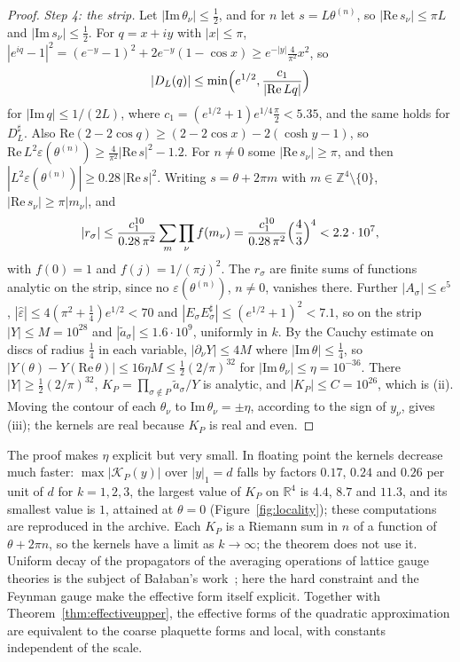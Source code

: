 \documentclass[11pt]{amsart}
\theoremstyle{definition}
\theoremstyle{remark}
\numberwithin{equation}{section}
\newcommand{\R}{\mathbb{R}}
\newcommand{\Z}{\mathbb{Z}}
\begin{document}
\begin{proof}
\emph{Step 4: the strip.} Let $|\mathrm{Im}\,\theta_\nu|\le\frac12$, and for
$n$ let $s=L\theta^{(n)}$, so $|\mathrm{Re}\,s_\nu|\le\pi L$ and
$|\mathrm{Im}\,s_\nu|\le\frac12$. For $q=x+iy$ with $|x|\le\pi$,
$|e^{iq}-1|^2=(e^{-y}-1)^2+2e^{-y}(1-\cos x)\ge e^{-|y|}\frac4{\pi^2}x^2$,
so
\[
|D_L(q)|\le\min\Bigl(e^{1/2},\frac{c_1}{|\mathrm{Re}\,Lq|}\Bigr)
\]
for $|\mathrm{Im}\,q|\le1/(2L)$, where $c_1=(e^{1/2}+1)e^{1/4}\frac\pi2<5.35$, and the same holds for $D_L^\sharp$. Also
$\mathrm{Re}(2-2\cos q)\ge(2-2\cos x)-2(\cosh y-1)$, so
$\mathrm{Re}\,L^2\varepsilon(\theta^{(n)})\ge\frac4{\pi^2}|\mathrm{Re}\,
s|^2-1.2$. For $n\ne0$ some $|\mathrm{Re}\,s_\nu|\ge\pi$, and then
$|L^2\varepsilon(\theta^{(n)})|\ge0.28\,|\mathrm{Re}\,s|^2$. Writing
$s=\theta+2\pi m$ with $m\in\Z^4\setminus\{0\}$, $|\mathrm{Re}\,s_\nu|\ge
\pi|m_\nu|$, and
\[
|r_\sigma|\le\frac{c_1^{10}}{0.28\,\pi^2}\sum_{m}\prod_\nu
f(m_\nu)=\frac{c_1^{10}}{0.28\,\pi^2}\Bigl(\frac43\Bigr)^4
<2.2\cdot10^7,
\]
with $f(0)=1$ and $f(j)=1/(\pi j)^2$. The $r_\sigma$ are finite sums of
functions analytic on the strip, since no $\varepsilon(\theta^{(n)})$,
$n\ne0$, vanishes there. Further $|A_\sigma|\le e^5$, $|\hat\varepsilon|
\le4(\pi^2+\frac14)e^{1/2}<70$ and $|E_\sigma E_\sigma^\sharp|\le
(e^{1/2}+1)^2<7.1$, so on the strip $|Y|\le M=10^{28}$ and $|\tilde
a_\sigma|\le1.6\cdot10^9$, uniformly in $k$. By the Cauchy estimate on
discs of radius $\frac14$ in each variable, $|\partial_\nu Y|\le4M$ where
$|\mathrm{Im}\,\theta|\le\frac14$, so $|Y(\theta)-Y(\mathrm{Re}\,\theta)|\le
16\eta M\le\frac12(2/\pi)^{32}$ for $|\mathrm{Im}\,\theta_\nu|\le\eta=
10^{-36}$. There $|Y|\ge\frac12(2/\pi)^{32}$, $K_P=\prod_{\sigma\notin P}
\tilde a_\sigma/Y$ is analytic, and $|K_P|\le C=10^{26}$, which is (ii).
Moving the contour of each $\theta_\nu$ to $\mathrm{Im}\,\theta_\nu=
\pm\eta$, according to the sign of $y_\nu$, gives (iii); the kernels are
real because $K_P$ is real and even.
\end{proof}

The proof makes $\eta$ explicit but very small. In floating point the
kernels decrease much faster: $\max|\mathcal K_P(y)|$ over $|y|_1=d$ falls
by factors $0.17$, $0.24$ and $0.26$ per unit of $d$ for $k=1,2,3$, the largest value of
$K_P$ on $\R^4$ is $4.4$, $8.7$ and $11.3$, and its smallest value is $1$, attained at
$\theta=0$ (Figure~\ref{fig:locality}); these computations are reproduced in
the archive. Each $K_P$ is a Riemann sum in $n$ of a function of
$\theta+2\pi n$, so the kernels have a limit as $k\to\infty$; the theorem
does not use it. Uniform decay of the propagators of the averaging
operations of lattice gauge theories is the subject of Ba{\l}aban's
work~\cite{Bal84a}; here the hard constraint and the Feynman gauge make the
effective form itself explicit. Together with Theorem~\ref{thm:effectiveupper},
the effective forms of the quadratic approximation are equivalent to the
coarse plaquette forms and local, with constants independent of the scale.
\end{document}
